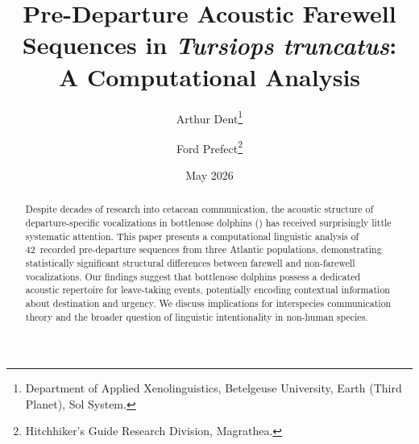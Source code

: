 \documentclass[12pt, a4paper]{article}
\begin{document}
\title{Pre-Departure Acoustic Farewell Sequences in
	\emph{Tursiops truncatus}:\\
	A Computational Analysis}
\author{%
	Arthur Dent\thanks{Department of Applied Xenolinguistics, Betelgeuse
		University, Earth (Third Planet), Sol System.}
	\and
	Ford Prefect\thanks{Hitchhiker's Guide Research Division, Magrathea.}
}
\date{May 2026}

\maketitle

\begin{abstract}
	Despite decades of research into cetacean communication, the acoustic
	structure of departure-specific vocalizations in bottlenose dolphins
	() has received surprisingly little systematic
	attention. This paper presents a computational linguistic analysis of
	42~recorded pre-departure sequences from three Atlantic populations,
	demonstrating statistically significant structural differences between
	farewell and non-farewell vocalizations. Our findings suggest that
	bottlenose dolphins possess a dedicated acoustic repertoire for
	leave-taking events, potentially encoding contextual information about
	destination and urgency. We discuss implications for interspecies
	communication theory and the broader question of linguistic intentionality
	in non-human species.
\end{abstract}

\newpage
\tableofcontents
\newpage





\printbibliography[heading=bibintoc, title={References}]
\end{document}
